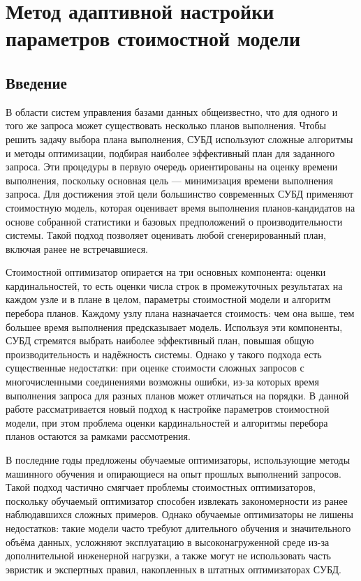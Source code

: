 \chapter{Метод адаптивной настройки параметров стоимостной модели}\label{ch:ch2}
\section{Введение}\label{sec:ch2/sec1}
В области систем управления базами данных общеизвестно, что для одного и того же запроса может существовать несколько планов выполнения. Чтобы решить задачу выбора плана выполнения, СУБД используют сложные алгоритмы и методы оптимизации, подбирая наиболее эффективный план для заданного запроса. Эти процедуры в первую очередь ориентированы на оценку времени выполнения, поскольку основная цель — минимизация времени выполнения запроса. Для достижения этой цели большинство современных СУБД применяют стоимостную модель, которая оценивает время выполнения планов-кандидатов на основе собранной статистики и базовых предположений о производительности системы. Такой подход позволяет оценивать любой сгенерированный план, включая ранее не встречавшиеся.

Стоимостной оптимизатор опирается на три основных компонента: оценки кардинальностей, то есть оценки числа строк в промежуточных результатах на каждом узле и в плане в целом, параметры стоимостной модели и алгоритм перебора планов. Каждому узлу плана назначается стоимость: чем она выше, тем большее время выполнения предсказывает модель. Используя эти компоненты, СУБД стремятся выбрать наиболее эффективный план, повышая общую производительность и надёжность системы. Однако у такого подхода есть существенные недостатки: при оценке стоимости сложных запросов с многочисленными соединениями возможны ошибки, из-за которых время выполнения запроса для разных планов может отличаться на порядки. В данной работе рассматривается новый подход к настройке параметров стоимостной модели, при этом проблема оценки кардинальностей и алгоритмы перебора планов остаются за рамками рассмотрения.

В последние годы предложены обучаемые оптимизаторы, использующие методы машинного обучения и опирающиеся на опыт прошлых выполнений запросов. Такой подход частично смягчает проблемы стоимостных оптимизаторов, поскольку обучаемый оптимизатор способен извлекать закономерности из ранее наблюдавшихся сложных примеров. Однако обучаемые оптимизаторы не лишены недостатков: такие модели часто требуют длительного обучения и значительного объёма данных, усложняют эксплуатацию в высоконагруженной среде из-за дополнительной инженерной нагрузки, а также могут не использовать часть эвристик и экспертных правил, накопленных в штатных оптимизаторах СУБД.

